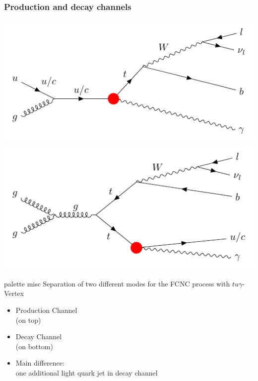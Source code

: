 \documentclass{beamer}
\begin{document}
\LogoOff
\begin{frame}[fragile]
\frametitle{Production and decay channels}
\begin{minipage}{0.60\textwidth}
	\includegraphics[width=1\linewidth]{images/prod.pdf}\\
	\includegraphics[width=1\linewidth]{images/decay.pdf}
\end{minipage}
\begin{minipage}{0.36\textwidth}
\vspace{-5mm}
\begin{beamercolorbox}[rounded=true,shadow=true]{palette misc}
			Separation of two different modes for the FCNC process with $tu\gamma$-Vertex
			\\
		\begin{itemize}
			\item Production Channel\\ (on top)
			\vspace{5mm}
			\item Decay Channel \\ (on bottom)
			\vspace{5mm}
			\item Main difference:\\ one additional light quark jet in decay channel
		\end{itemize}
	\end{beamercolorbox}
\end{minipage}
\end{frame}
\end{document}
